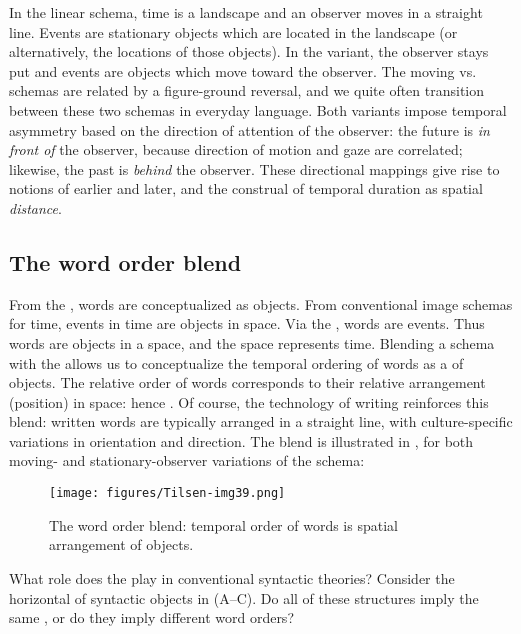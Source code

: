   In the  linear schema, time is a landscape and an observer moves in a straight line. Events are stationary objects which are located in the landscape (or alternatively, the locations of those objects). In the  variant, the observer stays put and events are objects which move toward the observer. The moving vs.  schemas are related by a figure-ground reversal, and we quite often transition between these two schemas in everyday language. Both variants impose temporal asymmetry based on the direction of attention of the observer: the future is \textit{in front of} the observer, because direction of motion and gaze are correlated; likewise, the past is \textit{behind} the observer. These directional mappings give rise to notions of earlier and later, and the construal of temporal duration as spatial \textit{distance}. 

\subsection{The word order blend}

From the , words are conceptualized as objects. From conventional image schemas for time, events in time are objects in space. Via the , words are events. Thus words are objects in a space, and the space represents time. Blending a  schema with the  allows us to conceptualize the temporal ordering of words as a  of objects. The relative order of words corresponds to their relative arrangement (position) in space: hence {}. Of course, the technology of writing reinforces this blend: written words are typically arranged in a straight line, with culture-specific variations in orientation and direction. The blend is illustrated in {}, for both moving- and stationary-observer variations of the schema:

  
\begin{figure}
\texttt{[image: figures/Tilsen-img39.png]}
\caption{The word order blend: temporal order of words is spatial arrangement of objects.}
\label{fig:3:11}
\end{figure}\clearpage

  What role does the  play in conventional syntactic theories? Consider the horizontal  of syntactic objects in {}(A--C). Do all of these structures imply the same , or do they imply different word orders?

